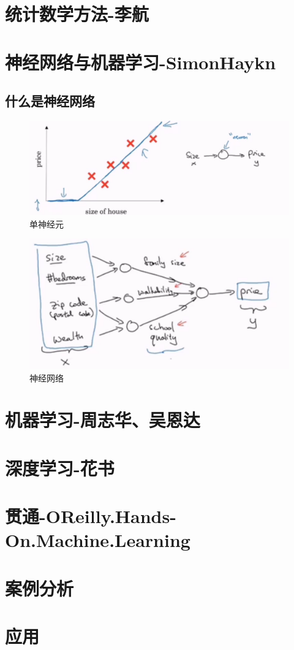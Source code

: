 \documentclass[UTF8,a4paper,12pt]{ctexbook}
\begin{document}
		
				
\chapter{统计数学方法-李航}


\chapter{神经网络与机器学习-SimonHaykn}
	\section{什么是神经网络}
		\begin{figure}[H]
			\centering
			\includegraphics[width=\linewidth]{Neuron}
			\caption{单神经元}
		\end{figure}
	
	
		\begin{figure}[H]
			\centering
			\includegraphics[width=\linewidth]{Neuron2}
			\caption{神经网络}
		\end{figure}
	
	

\chapter{机器学习-周志华、吴恩达}


\chapter{深度学习-花书}

\chapter{贯通-OReilly.Hands-On.Machine.Learning}


\chapter{案例分析}


\chapter{应用}



  
		    
\end{document}
